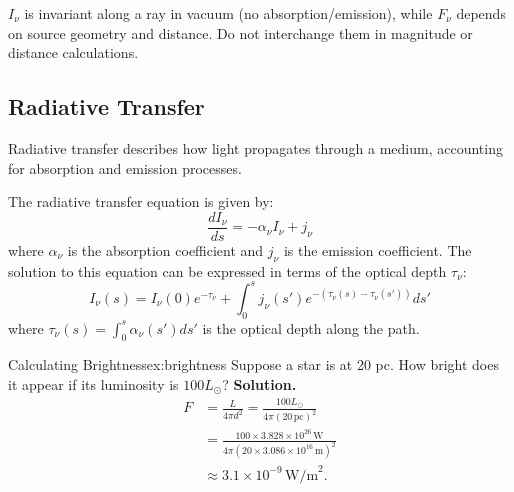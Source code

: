 \begin{importantnote}
$I_\nu$ is invariant along a ray in vacuum (no absorption/emission), while $F_\nu$ depends on source geometry and distance.
Do not interchange them in magnitude or distance calculations.
\end{importantnote}

\bigskip\noindent \bigskip\noindent \bigskip\noindent
\subsection{Radiative Transfer}
\begin{intuition}
Radiative transfer describes how light propagates through a medium, accounting for absorption and emission processes.
\end{intuition}
\begin{theory}
The radiative transfer equation is given by:
\begin{equation}
\frac{dI_\nu}{ds} = -\alpha_\nu I_\nu + j_\nu
\end{equation}
where $\alpha_\nu$ is the absorption coefficient and $j_\nu$ is the emission coefficient. The solution to this equation can be expressed in terms of the optical depth $\tau_\nu$:
\begin{equation}
I_\nu(s) = I_\nu(0) e^{-\tau_\nu} + \int_0^s j_\nu(s') e^{-(\tau_\nu(s) - \tau_\nu(s'))} ds'
\end{equation}
where $\tau_\nu(s) = \int_0^s \alpha_\nu(s') ds'$ is the optical depth along the path.
\end{theory}

\begin{example}{Calculating Brightness}{ex:brightness}
Suppose a star is at 20 pc. How bright does it appear if its luminosity is $100 L_\odot$?
\smallskip\textbf{Solution.}
\begin{align*}
F &= \frac{L}{4\pi d^2} = \frac{100 L_\odot}{4\pi (20\,\text{pc})^2} \\
&= \frac{100 \times 3.828 \times 10^{26}\,\text{W}}{4\pi (20 \times 3.086 \times 10^{16}\,\text{m})^2} \\
&\approx 3.1 \times 10^{-9}\,\text{W/m}^2.
\end{align*}
\end{example}

\bigskip\noindent \bigskip\noindent \bigskip\noindent
